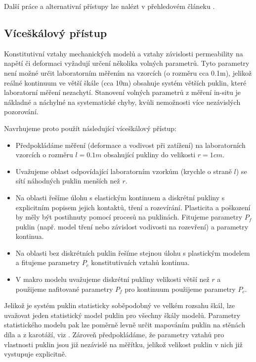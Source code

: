 \documentclass{article}
\begin{document}
Další práce a alternativní přístupy lze nalézt v přehledovém článeku \cite{Shahbazi2020a}. 




\subsection{Víceškálový přístup}
\label{sec:mikroskala}
Konstitutivní vztahy mechanických modelů a vztahy závislosti permeability na napětí či deformaci vyžadují určení 
několika volných parametrů. Tyto parametry není možné určit laboratorním měřením na vzorcích (o rozměru cca 0.1m), 
jelikož reálné kontinuum ve větší škále (cca 10m) obsahuje systém větších puklin, které laboratorní měření nezachytí. 
Stanovení volných parametrů z měření in-situ je nákladné a náchylné na systematické chyby, kvůli nemožnosti 
více nezávislých pozorování. 


Navrhujeme proto použít následující víceškálový přístup:
\begin{itemize}
 \item Předpokládáme měření (deformace a vodivost při zatížení) na laboratorních vzorcích o rozměru $l=0.1m$ obsahující pukliny do velikosti $r=1cm$.
 \item Uvažujeme oblast odpovídající laboratorním vzorkům (krychle o straně $l$) se sítí náhodných puklin menších než $r$.
 \item Na oblasti řešíme úlohu s elastickým kontinuem a diskrétní pukliny s explicitním popisem jejich kontaktů, tření a rozevírání.
       Plasticita a poškození by měly být postihnuty pomocí procesů na puklinách. Fitujeme parametry $P_f$ puklin (např. model tření nebo závislost vodivosti na rozevření) a parametry kontinua. 
 \item Na oblasti bez diskrétních puklin řešíme stejnou úlohu s plastickým modelem a fitujeme parametry $P_c$ konstitutivních vztahů kontinua.
 \item V makro modelu uvažujeme diskrétní pukliny velikosti větší než $r$ a použijeme nafitované parametry $P_f$ pro kontinuum použijeme parametry $P_c$.
\end{itemize}
Jelikož je systém puklin statisticky soběpodobný ve velkém rozsahu škál, lze uvažovat jeden statistický model puklin pro všechny škály modelů.
Parametry statistického modelu pak lze poměrně levně určit mapováním puklin na stěnách díla a z karotáží, viz \cite{Bonnet2001}.
Zároveň předpokládáme, že parametry vztahů pro vlastnosti puklin jsou již nezávislé na měřítku, 
jelikož velikost puklin v nich již vystupuje explicitně. 
\end{document}
